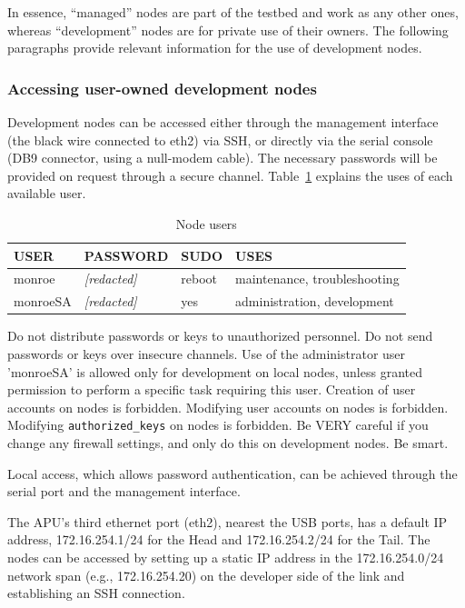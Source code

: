 \documentclass[a4paper,10pt]{article}
\newcommand{\identifier}[1]{{\texttt{\small{#1}}}}
\begin{document}
In essence, ``managed'' nodes are part of the testbed and work as any other ones, whereas ``development'' nodes are for private use of their owners.
The following paragraphs provide relevant information for the use of development nodes.

\subsubsection{Accessing user-owned development nodes}
Development nodes can be accessed either through the management interface (the black wire connected to eth2) via SSH, or directly via the serial console (DB9 connector, using a null-modem cable).
The necessary passwords will be provided on request through a secure channel.
Table~\ref{tab:developmentNodeUsers} explains the uses of each available user.

\begin{table}[tp]
	\caption{Node users}\label{tab:developmentNodeUsers}
	\begin{center}
		\begin{tabular}{llll}
			\toprule
			\textbf{USER} & \textbf{PASSWORD} & \textbf{SUDO} & \textbf{USES} \\ \midrule
			monroe & \emph{[redacted]} & reboot & maintenance, troubleshooting \\
			monroeSA & \emph{[redacted]} & yes & administration, development \\
			\bottomrule
		\end{tabular}
	\end{center}
\end {table}

Do not distribute passwords or keys to unauthorized personnel.
Do not send passwords or keys over insecure channels.
Use of the administrator user 'monroeSA' is allowed only for development on local nodes, unless granted permission to perform a specific task requiring this user.
Creation of user accounts on nodes is forbidden.
Modifying user accounts on nodes is forbidden.
Modifying \identifier{authorized\_keys} on nodes is forbidden.
Be VERY careful if you change any firewall settings, and only do this on development nodes.
Be smart.

Local access, which allows password authentication, can be achieved through the serial port and the management interface.

The APU's third ethernet port (eth2), nearest the USB ports, has a default IP
address, 172.16.254.1/24 for the Head and 172.16.254.2/24 for the Tail. The
nodes can be accessed by setting up a static IP address in the 172.16.254.0/24
network span (e.g., 172.16.254.20) on the developer side of the link and
establishing an SSH connection.
\end{document}
